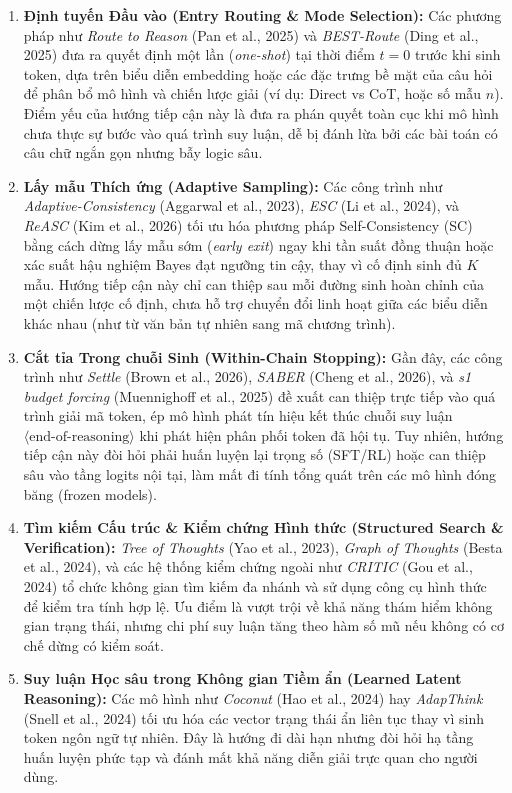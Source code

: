 \documentclass[11pt,a4paper]{report}
\begin{document}
\begin{enumerate}[leftmargin=*]
    \item \textbf{Định tuyến Đầu vào (Entry Routing \& Mode Selection):}  
    Các phương pháp như \textit{Route to Reason} (Pan et al., 2025) và \textit{BEST-Route} (Ding et al., 2025) đưa ra quyết định một lần (\textit{one-shot}) tại thời điểm $t=0$ trước khi sinh token, dựa trên biểu diễn embedding hoặc các đặc trưng bề mặt của câu hỏi để phân bổ mô hình và chiến lược giải (ví dụ: Direct vs CoT, hoặc số mẫu $n$). Điểm yếu của hướng tiếp cận này là đưa ra phán quyết toàn cục khi mô hình chưa thực sự bước vào quá trình suy luận, dễ bị đánh lừa bởi các bài toán có câu chữ ngắn gọn nhưng bẫy logic sâu.

    \item \textbf{Lấy mẫu Thích ứng (Adaptive Sampling):}  
    Các công trình như \textit{Adaptive-Consistency} (Aggarwal et al., 2023), \textit{ESC} (Li et al., 2024), và \textit{ReASC} (Kim et al., 2026) tối ưu hóa phương pháp Self-Consistency (SC) bằng cách dừng lấy mẫu sớm (\textit{early exit}) ngay khi tần suất đồng thuận hoặc xác suất hậu nghiệm Bayes đạt ngưỡng tin cậy, thay vì cố định sinh đủ $K$ mẫu. Hướng tiếp cận này chỉ can thiệp sau mỗi đường sinh hoàn chỉnh của một chiến lược cố định, chưa hỗ trợ chuyển đổi linh hoạt giữa các biểu diễn khác nhau (như từ văn bản tự nhiên sang mã chương trình).

    \item \textbf{Cắt tỉa Trong chuỗi Sinh (Within-Chain Stopping):}  
    Gần đây, các công trình như \textit{Settle} (Brown et al., 2026), \textit{SABER} (Cheng et al., 2026), và \textit{s1 budget forcing} (Muennighoff et al., 2025) đề xuất can thiệp trực tiếp vào quá trình giải mã token, ép mô hình phát tín hiệu kết thúc chuỗi suy luận $\langle\text{end-of-reasoning}\rangle$ khi phát hiện phân phối token đã hội tụ. Tuy nhiên, hướng tiếp cận này đòi hỏi phải huấn luyện lại trọng số (SFT/RL) hoặc can thiệp sâu vào tầng logits nội tại, làm mất đi tính tổng quát trên các mô hình đóng băng (frozen models).

    \item \textbf{Tìm kiếm Cấu trúc \& Kiểm chứng Hình thức (Structured Search \& Verification):}  
    \textit{Tree of Thoughts} (Yao et al., 2023), \textit{Graph of Thoughts} (Besta et al., 2024), và các hệ thống kiểm chứng ngoài như \textit{CRITIC} (Gou et al., 2024) tổ chức không gian tìm kiếm đa nhánh và sử dụng công cụ hình thức để kiểm tra tính hợp lệ. Ưu điểm là vượt trội về khả năng thám hiểm không gian trạng thái, nhưng chi phí suy luận tăng theo hàm số mũ nếu không có cơ chế dừng có kiểm soát.

    \item \textbf{Suy luận Học sâu trong Không gian Tiềm ẩn (Learned Latent Reasoning):}  
    Các mô hình như \textit{Coconut} (Hao et al., 2024) hay \textit{AdapThink} (Snell et al., 2024) tối ưu hóa các vector trạng thái ẩn liên tục thay vì sinh token ngôn ngữ tự nhiên. Đây là hướng đi dài hạn nhưng đòi hỏi hạ tầng huấn luyện phức tạp và đánh mất khả năng diễn giải trực quan cho người dùng.
\end{enumerate}
\end{document}
